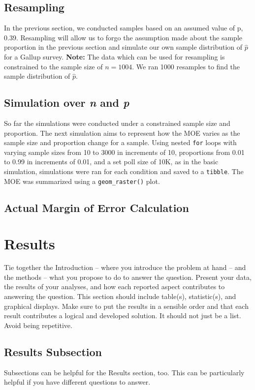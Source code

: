 \documentclass{article}\usepackage[]{graphicx}\usepackage[]{xcolor}
\begin{document}
\begin{multicols}{2}
\subsection{Resampling}
In the previous section, we conducted samples based on an assumed value of p, 0.39. Resampling will allow us to forgo the assumption made about the sample proportion in the previous section and simulate our own sample distribution of $\hat{p}$ for a Gallup survey. \textbf{Note:} The data which can be used for resampling is constrained to the sample size of $n = 1004$. We ran 1000 resamples to find the sample distribution of $\hat{p}$.

\subsection{Simulation over \textit{n} and \textit{p}}
So far the simulations were conducted under a constrained sample size and proportion. The next simulation aims to represent how the MOE varies as the sample size and proportion change for a sample. Using nested \texttt{for} loops with varying sample sizes from 10 to 3000 in increments of 10, proportions from 0.01 to 0.99 in increments of 0.01, and a set poll size of 10K, as in the basic simulation, simulations were ran for each condition and saved to a \texttt{tibble}. The MOE was summarized using a \verb|geom_raster()| plot. 

\subsection{Actual Margin of Error Calculation}



\section{Results}
Tie together the Introduction -- where you introduce the problem at hand -- and the methods --  what you propose to do to answer the question. Present your data, the results of your analyses, and how each reported aspect contributes to answering the question. This section should include table(s), statistic(s), and graphical displays. Make sure to put the results in a sensible order and that each result contributes a logical and developed solution. It should not just be a list. Avoid being repetitive. 

\subsection{Results Subsection}
Subsections can be helpful for the Results section, too. This can be particularly helpful if you have different questions to answer. 



\end{multicols}
\end{document}
